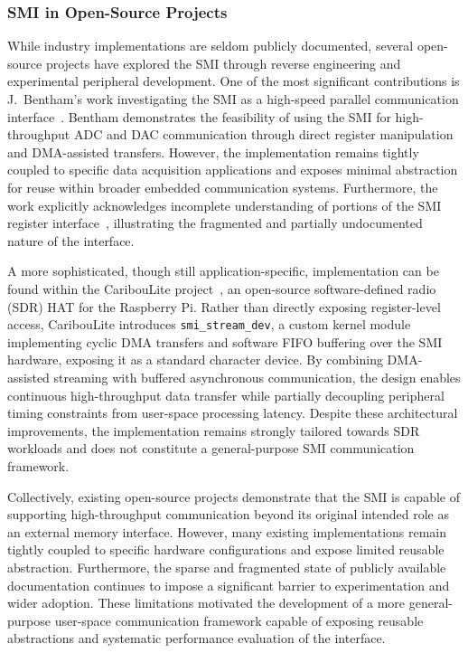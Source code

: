\documentclass[final]{cmpreport}
\begin{document}
\subsubsection{SMI in Open-Source Projects}
While industry implementations are seldom publicly documented, several open-source projects have explored the SMI through reverse engineering and experimental peripheral development. One of the most significant contributions is J.~Bentham's work investigating the SMI as a high-speed parallel communication interface~\cite{iosoftcodeRaspberryPiSecondary2020}. Bentham demonstrates the feasibility of using the SMI for high-throughput ADC and DAC communication through direct register manipulation and DMA-assisted transfers. However, the implementation remains tightly coupled to specific data acquisition applications and exposes minimal abstraction for reuse within broader embedded communication systems. Furthermore, the work explicitly acknowledges incomplete understanding of portions of the SMI register interface~\cite{iosoftcodeRaspberryPiSecondary2020}, illustrating the fragmented and partially undocumented nature of the interface.

A more sophisticated, though still application-specific, implementation can be found within the CaribouLite project~\cite{CariboulabsCariboulite2026}, an open-source software-defined radio (SDR) HAT for the Raspberry Pi. Rather than directly exposing register-level access, CaribouLite introduces \texttt{smi\_stream\_dev}, a custom kernel module implementing cyclic DMA transfers and software FIFO buffering over the SMI hardware, exposing it as a standard character device. By combining DMA-assisted streaming with buffered asynchronous communication, the design enables continuous high-throughput data transfer while partially decoupling peripheral timing constraints from user-space processing latency. Despite these architectural improvements, the implementation remains strongly tailored towards SDR workloads and does not constitute a general-purpose SMI communication framework.

Collectively, existing open-source projects demonstrate that the SMI is capable of supporting high-throughput communication beyond its original intended role as an external memory interface. However, many existing implementations remain tightly coupled to specific hardware configurations and expose limited reusable abstraction. Furthermore, the sparse and fragmented state of publicly available documentation continues to impose a significant barrier to experimentation and wider adoption. These limitations motivated the development of a more general-purpose user-space communication framework capable of exposing reusable abstractions and systematic performance evaluation of the interface. 
\end{document}
